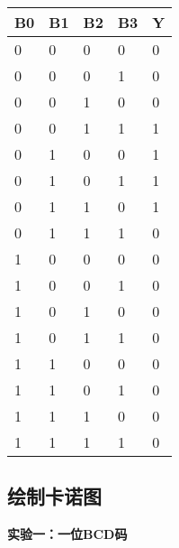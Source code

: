 \documentclass[a4paper,12pt]{article}
\begin{document}
\begin{table}[h]
\begin{minipage}{0.48\textwidth}
        \begin{tabular}{|l|l|l|l|l|}
            \hline
            \textbf{B0} & \textbf{B1} & \textbf{B2} & \textbf{B3} & \textbf{Y} \\ \hline
            0           & 0           & 0           & 0           & 0          \\ \hline
            0           & 0           & 0           & 1           & 0          \\ \hline
            0           & 0           & 1           & 0           & 0          \\ \hline
            0           & 0           & 1           & 1           & 1          \\ \hline
            0           & 1           & 0           & 0           & 1          \\ \hline
            0           & 1           & 0           & 1           & 1          \\ \hline
            0           & 1           & 1           & 0           & 1          \\ \hline
            0           & 1           & 1           & 1           & 0          \\ \hline
            1           & 0           & 0           & 0           & 0          \\ \hline
            1           & 0           & 0           & 1           & 0          \\ \hline
            1           & 0           & 1           & 0           & 0          \\ \hline
            1           & 0           & 1           & 1           & 0          \\ \hline
            1           & 1           & 0           & 0           & 0          \\ \hline
            1           & 1           & 0           & 1           & 0          \\ \hline
            1           & 1           & 1           & 0           & 0          \\ \hline
            1           & 1           & 1           & 1           & 0          \\ \hline
        \end{tabular}
    \end{minipage}
\end{table}

\newpage

\subsection{绘制卡诺图}
\textbf{实验一：一位BCD码}
\end{document}
